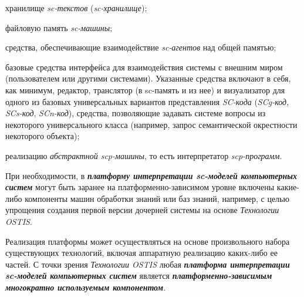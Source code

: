 \begin{SCn}
{\begin{scnitemize}
    \item хранилище \textit{sc-текстов} (\textit{sc-хранилище});
    \item файловую память \textit{sc-машины};
    \item средства, обеспечивающие взаимодействие \textit{sc-агентов} над общей памятью;
    \item базовые средства интерфейса для взаимодействия системы с внешним миром (пользователем или другими системами). Указанные средства включают в себя, как минимум, редактор, транслятор (в sc-память и из нее) и визуализатор для одного из базовых универсальных вариантов представления \textit{SC-кода} (\textit{SCg-код}, \textit{SCs-код}, \textit{SCn-код}), средства, позволяющие задавать системе вопросы из некоторого универсального класса (например, запрос семантической окрестности некоторого объекта);
    \item реализацию \textit{абстрактной scp-машины}, то есть интерпретатор \textit{scp-программ}.
\end{scnitemize}
При необходимости, в \textbf{\textit{платформу интерпретации sc-моделей компьютерных систем}} могут быть заранее на платформенно-зависимом уровне включены какие-либо компоненты машин обработки знаний или баз знаний, например, с целью упрощения создания первой версии дочерней системы на основе \textit{Технологии OSTIS}.

Реализация платформы может осуществляться на основе произвольного набора существующих технологий, включая аппаратную реализацию каких-либо ее частей. С точки зрения \textit{Технологии OSTIS} любая \textbf{\textit{платформа интерпретации sc-моделей компьютерных систем}} является \textbf{\textit{платформенно-зависимым многократно используемым компонентом}}.}

\scnendstruct

\end{SCn}
